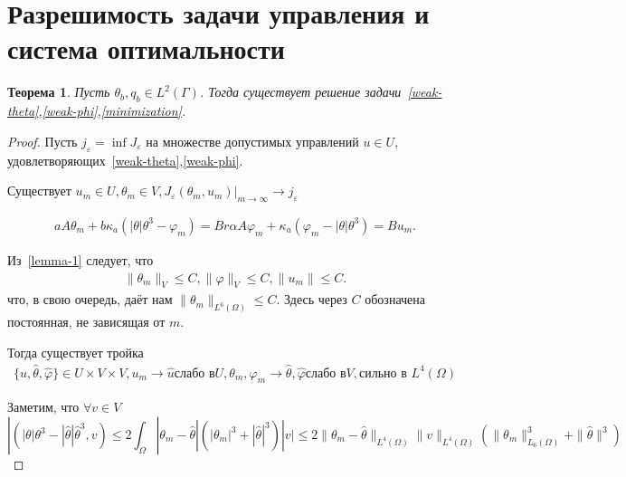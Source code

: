 \documentclass[10pt]{article}
\newtheorem{thm}{\indent Теорема}
\begin{document}
    \section{Разрешимость задачи управления и система оптимальности}\label{sec:solvability-control}

    \begin{thm}
        \label{cp-existing}
        Пусть $\theta_b, q_b \in L^2(\Gamma)$.
        Тогда существует решение
        задачи~\eqref{weak-theta},\eqref{weak-phi},\eqref{minimization}.
    \end{thm}
    \begin{proof}
        Пусть $j_\varepsilon = \inf J_\varepsilon$ на множестве допустимых управлений $u \in U$,
        удовлетворяющих~\eqref{weak-theta},\eqref{weak-phi}.

        Существует $u_m \in U, \theta_m \in V, J_\varepsilon(\theta_m, u_m)|_{m \rightarrow \infty}
        \rightarrow j_\varepsilon $

        \begin{gather}
            \label{theorem-1-operational}
            a A \theta_m +b \kappa_a(|\theta|\theta^3 - \varphi_m) = Br
            \alpha A \varphi_m + \kappa_a (\varphi_m - |\theta|\theta^3) = B u_m.
        \end{gather}


        Из~\ref{lemma-1} следует, что
        \begin{gather*}
            \|\theta_m\|_V \leq C,
            \|\varphi\|_V \leq C,
            \|u_m\| \leq C.
        \end{gather*}
        что, в свою очередь, даёт нам $\|\theta_m\|_{L^6(\Omega)} \leq C.$
        Здесь через $C$ обозначена постоянная, не зависящая от $m$.

        Тогда существует тройка
        \begin{gather*}
            \label{theorem-1-convergence}
            \{ \hat{u}, \hat{\theta}, \hat{\varphi} \} \in U \times V \times V,
            u_m \rightarrow \hat{u} \text{слабо в} U,
            \theta_m, \varphi_m \rightarrow \hat{\theta}, \hat{\varphi} \text{слабо в} V, \text{сильно в } L^4(\Omega)
        \end{gather*}

        Заметим, что $\forall v \in V$
        \begin{equation}
            \label{theorem-1-est}
            |( |\theta|\theta^3 - |\hat{\theta}|\hat{\theta}^3, v) \leq
            2 \int_\Omega |\theta_m - \hat{\theta}| (|\theta_m|^3 + |\hat{\theta}|^3)|v| \leq
            2 \| \theta_m - \hat{\theta}\|_{L^4(\Omega)} \|v\|_{L^4(\Omega)}
            ( \| \theta_m \|^3_{L_6(\Omega)} + \| \hat{\theta} \|^3)
        \end{equation}


\end{proof}
\end{document}
